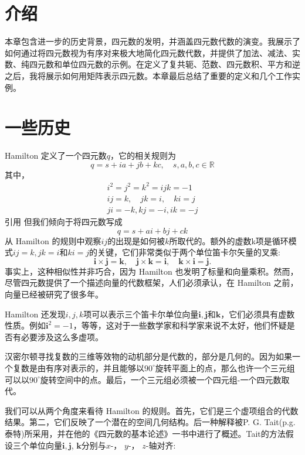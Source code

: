 
\section{介绍}
本章包含进一步的历史背景，四元数的发明，并涵盖四元数代数的演变。我展示了如何通过将四元数视为有序对来极大地简化四元数代数，并提供了加法、减法、实数、纯四元数和单位四元数的示例。在定义了复共轭、范数、四元数积、平方和逆之后，我将展示如何用矩阵表示四元数。本章最后总结了重要的定义和几个工作实例。



\section{一些历史}
Hamilton 定义了一个四元数$q$，它的相关规则为
$$
    q=s+i a+j b+k c, \quad s, a, b, c \in \mathbb{R}
$$
其中，
$$
    \begin{gathered}
        i^{2}=j^{2}=k^{2}=i j k=-1 \\
        i j=k, \quad j k=i, \quad k i=j \\
        j i=-k, k j=-i, i k=-j
    \end{gathered}
$$
引用\cite{bib6-1,bib6-2,bib6-3} 但我们倾向于将四元数写成
$$
    q=s+a i+b j+c k
$$
从 Hamilton 的规则中观察$i  j$的出现是如何被$k$所取代的。额外的虚数k项是循环模式$i j=k, j k=i$和$k i=j$的关键，它们非常类似于两个单位笛卡尔矢量的叉乘:
$$
    \mathbf{i} \times \mathbf{j}=\mathbf{k}, \quad \mathbf{j} \times \mathbf{k}=\mathbf{i}, \quad \mathbf{k} \times \mathbf{i}=\mathbf{j} .
$$
事实上，这种相似性并非巧合，因为 Hamilton 也发明了标量和向量乘积。然而，尽管四元数提供了一个描述向量的代数框架，人们必须承认，在 Hamilton 之前，向量已经被研究了很多年。

Hamilton 还发现$i, j, k$项可以表示三个笛卡尔单位向量$\mathbf{i}, \mathbf{j}$和$\mathbf{k}$，它们必须具有虚数性质。例如$\mathbf{i}^{2}=-1$，等等，这对于一些数学家和科学家来说不太好，他们怀疑是否有必要涉及这么多虚项。

汉密尔顿寻找复数的三维等效物的动机部分是代数的，部分是几何的。因为如果一个复数是由有序对表示的，并且能够以$90^{\circ}$旋转平面上的点，那么也许一个三元组可以以$90^{\circ}$旋转空间中的点。最后，一个三元组必须被一个四元组-一个四元数取代。

我们可以从两个角度来看待 Hamilton 的规则。首先，它们是三个虚项组合的代数结果。第二，它们反映了一个潜在的空间几何结构。后一种解释被P. G. Tait(p.g.泰特)所采用，并在他的《四元数的基本论述》一书中进行了概述。Tait的方法假设三个单位向量$\mathbf{i}, \mathbf{j}$, $\mathbf{k}$分别与$x$-， $y$-， $z$-轴对齐:

